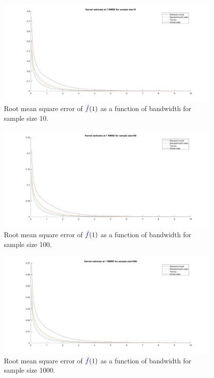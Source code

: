 \documentclass{article}
\renewcommand{\r}[1]{\textcolor{blue}{#1}}
\begin{document}
\begin{center}
\begin{figure}
\centering
\includegraphics[width=13cm]{q2rmse10d.jpg}
\caption{Root mean square error of $\r{\hat{f}}(1)$ as a function of bandwidth for sample size 10.}
\label{fig:2rmse10}
\end{figure} 
\end{center}

\begin{center}
\begin{figure}
\centering
\includegraphics[width=13cm]{q2rmse100d.jpg}
\caption{Root mean square error of $\r{\hat{f}}(1)$ as a function of bandwidth for sample size 100.}
\label{fig:2rmse100}
\end{figure} 
\end{center}

\begin{center}
\begin{figure}
\centering
\includegraphics[width=13cm]{q2rmse1000d.jpg}
\caption{Root mean square error of $\r{\hat{f}}(1)$ as a function of bandwidth for sample size 1000.}
\label{fig:2rmse1000}
\end{figure} 
\end{center}
\end{document}

